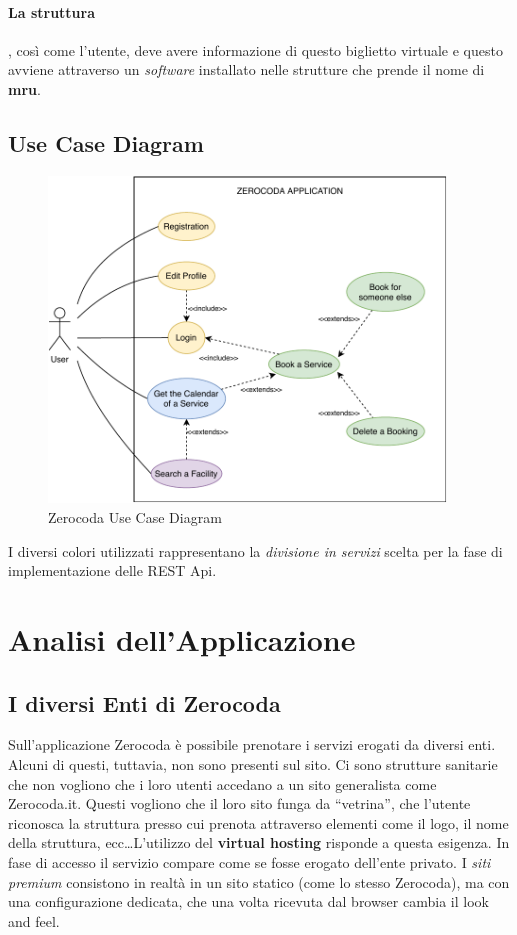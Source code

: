 \paragraph{La struttura}, così come l’utente, deve avere informazione di questo biglietto virtuale e questo avviene attraverso un \textsl{software} installato nelle strutture che prende il nome di \textbf{mru}.

\subsection{Use Case Diagram}
\begin{figure}[H]
    \centering
    \includegraphics[width=0.94\textwidth]{images/02_2_zerocoda_usecase.pdf}
    \caption{Zerocoda Use Case Diagram}
    \label{fig:zerocodausecase}
\end{figure}
I diversi colori utilizzati rappresentano la \textit{divisione in servizi} scelta per la fase di implementazione delle REST Api.

\section{Analisi dell'Applicazione}
\subsection{I diversi Enti di Zerocoda}
Sull'applicazione Zerocoda è possibile prenotare i servizi erogati da diversi enti. Alcuni di questi, tuttavia, non sono presenti sul sito. Ci sono strutture sanitarie che non vogliono che i loro utenti accedano a un sito generalista come \textsf{Zerocoda.it}. Questi vogliono che il loro sito funga da ``vetrina'', che l'utente riconosca la struttura presso cui prenota attraverso elementi come il logo, il nome della struttura, ecc\dots L'utilizzo del \textbf{virtual hosting} risponde a questa esigenza. In fase di accesso il servizio compare come se fosse erogato dell’ente privato. I \textit{siti premium} consistono in realtà in un sito statico (come lo stesso Zerocoda), ma con una configurazione dedicata, che una volta ricevuta dal browser cambia il \textsf{look and feel}. 

